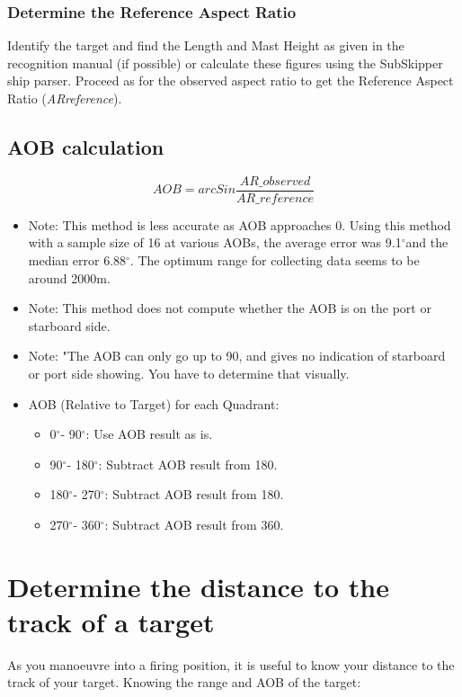 \documentclass{article}
\newcommand{\degree}{$^{\circ}$}
\begin{document}
\subsubsection{Determine the Reference Aspect Ratio}
Identify the target and find the Length and Mast Height as given in the recognition manual (if possible) or calculate these figures using the SubSkipper ship parser. Proceed as for the observed aspect ratio to get the Reference Aspect Ratio (\emph{ARreference}).

\subsection{AOB calculation}
$$AOB = arcSin \frac{AR\_{observed}}{AR\_{reference}}$$

\begin{itemize}
\item{Note: This method is less accurate as AOB approaches 0. Using this method with a sample size of 16 at various AOBs, the average error was 9.1\degree and the median error 6.88\degree. The optimum range for collecting data seems to be around 2000m.}
\item{Note: This method does not compute whether the AOB is on the port or starboard side.}
\item{Note: "The AOB can only go up to 90, and gives no indication of starboard or port side showing. You have to determine that visually.}

\item{
AOB (Relative to Target) for each Quadrant:
	\begin{itemize}
	\item{0\degree - 90\degree : Use AOB result as is.}
	\item{90\degree - 180\degree : Subtract AOB result from 180.}
	\item{180\degree - 270\degree : Subtract AOB result from 180.}
	\item{270\degree - 360\degree : Subtract AOB result from 360.}
	\end{itemize}

}
\end{itemize}

\section{Determine the distance to the track of a target}

As you manoeuvre into a firing position, it is useful to know your distance to the track of your target. Knowing the range and AOB of the target:
\end{document}
